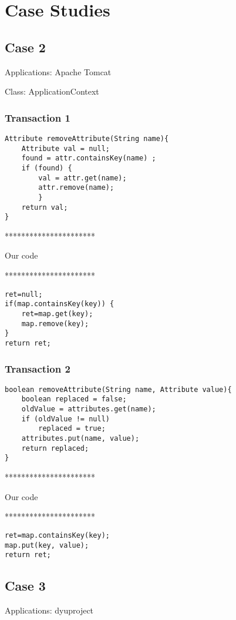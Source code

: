 \section{Case Studies}


\subsection{Case 2}
Applications: Apache Tomcat

Class: ApplicationContext


\subsubsection{Transaction 1}
\begin{lstlisting}
Attribute removeAttribute(String name){
	Attribute val = null;
	found = attr.containsKey(name) ;
	if (found) {
		val = attr.get(name);
		attr.remove(name);
		}
	return val;
}
\end{lstlisting}


**********************

Our code

**********************

\begin{lstlisting}
ret=null;
if(map.containsKey(key)) {
	ret=map.get(key);
	map.remove(key);
}
return ret;
\end{lstlisting}

\subsubsection{Transaction 2}
\begin{lstlisting}
boolean removeAttribute(String name, Attribute value){
	boolean replaced = false;
	oldValue = attributes.get(name);
	if (oldValue != null)
		replaced = true;
	attributes.put(name, value);
	return replaced;
}
\end{lstlisting}


**********************

Our code

**********************

\begin{lstlisting}
ret=map.containsKey(key);
map.put(key, value);
return ret;
\end{lstlisting}

\subsection{Case 3}
Applications: dyuproject

